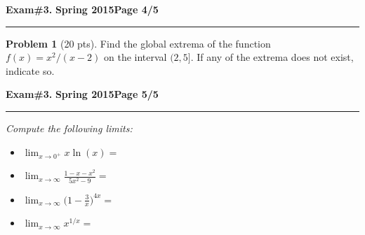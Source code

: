 \documentclass[12pt]{article}
\theoremstyle{definition}
\newtheorem{problem}{Problem}
\begin{document}
\hfill{\large\bf Exam\#3.}\hfill{\large\bf
  Spring 2015}\hfill{\large\bf Page 4/5}\hrule

\bigskip
\begin{problem}[20 pts]
Find the global extrema of the function $f(x) = x^2/(x-2)$ on the interval $(2,5]$.  If any of the extrema does not exist, indicate so.

\vspace{18cm}
\begin{center}
\end{center}
\end{problem}

\newpage


\hfill{\large\bf Exam\#3.}\hfill{\large\bf
  Spring 2015}\hfill{\large\bf Page 5/5}\hrule

\bigskip
{\problem \em Compute the following limits:}
\begin{itemize}
  \item[] [5 pts] $\displaystyle{\lim_{x\to 0^+} x \ln (x)} =$ \framebox[2cm][c]{\textcolor{white}{$\bigg ( $}}
  \vspace{3cm}
  \item[] [5 pts] $\displaystyle{\lim_{x\to\infty} \frac{1-x-x^2}{5x^2-9}} = $ \framebox[2cm][c]{\textcolor{white}{$\bigg ( $}}
  \vspace{3cm}
  \item[] [10 pts] $\displaystyle{\lim_{x\to\infty} \Big(1-\frac{3}{x} \Big)^{4x}} = $ \framebox[2cm][c]{\textcolor{white}{$\bigg ( $}}
  \vspace{6cm}
  \item[] [10 pts] $\displaystyle{\lim_{x\to\infty} x^{1/x}} = $ \framebox[2cm][c]{\textcolor{white}{$\bigg ( $}}
\end{itemize}
\end{document}
